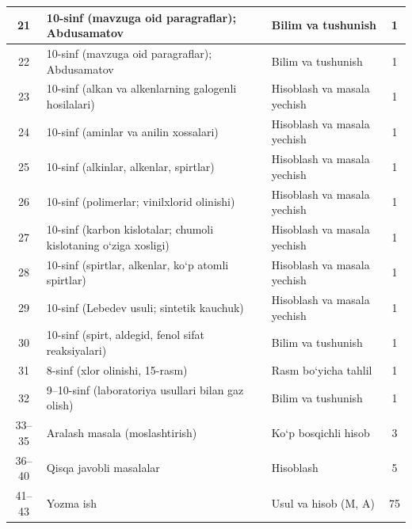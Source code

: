\documentclass[11pt,a4paper]{article}
\begin{document}
{\begin{longtable}{|c|p{7.2cm}|p{5.4cm}|c|}
21 & 10-sinf (mavzuga oid paragraflar); Abdusamatov & Bilim va tushunish & 1\\\hline
22 & 10-sinf (mavzuga oid paragraflar); Abdusamatov & Bilim va tushunish & 1\\\hline
23 & 10-sinf (alkan va alkenlarning galogenli hosilalari) & Hisoblash va masala yechish & 1\\\hline
24 & 10-sinf (aminlar va anilin xossalari) & Hisoblash va masala yechish & 1\\\hline
25 & 10-sinf (alkinlar, alkenlar, spirtlar) & Hisoblash va masala yechish & 1\\\hline
26 & 10-sinf (polimerlar; vinilxlorid olinishi) & Hisoblash va masala yechish & 1\\\hline
27 & 10-sinf (karbon kislotalar; chumoli kislotaning o`ziga xosligi) & Hisoblash va masala yechish & 1\\\hline
28 & 10-sinf (spirtlar, alkenlar, ko`p atomli spirtlar) & Hisoblash va masala yechish & 1\\\hline
29 & 10-sinf (Lebedev usuli; sintetik kauchuk) & Hisoblash va masala yechish & 1\\\hline
30 & 10-sinf (spirt, aldegid, fenol sifat reaksiyalari) & Bilim va tushunish & 1\\\hline
31 & 8-sinf (xlor olinishi, 15-rasm) & Rasm bo`yicha tahlil & 1\\\hline
32 & 9--10-sinf (laboratoriya usullari bilan gaz olish) & Bilim va tushunish & 1\\\hline
33--35 & Aralash masala (moslashtirish) & Ko`p bosqichli hisob & 3\\\hline
36--40 & Qisqa javobli masalalar & Hisoblash & 5\\\hline
41--43 & Yozma ish & Usul va hisob (M, A) & 75\\\hline
\end{longtable}}
\end{document}
